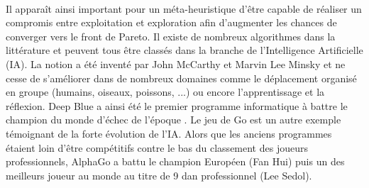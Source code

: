 



\paragraph{} %
Il apparaît ainsi important pour un méta-heuristique d’être capable de réaliser
un compromis entre exploitation et exploration afin d’augmenter les chances de
converger vers le front de Pareto. Il existe de nombreux algorithmes dans la littérature
et peuvent tous être classés dans la branche de l’Intelligence Artificielle (IA).
La notion a été inventé par John McCarthy et Marvin Lee Minsky et ne cesse de s’améliorer
dans de nombreux domaines comme le déplacement organisé en groupe (humains, oiseaux, poissons, ...)
ou encore l’apprentissage et la réflexion. Deep Blue a ainsi été le premier programme
informatique à battre le champion du monde d’échec de l’époque \parencite{Hsu199970}.
Le jeu de Go est un autre exemple témoignant de la forte évolution de l’IA. Alors que
les anciens programmes étaient loin d’être compétitifs contre le bas du classement
des joueurs professionnels, AlphaGo \parencite{Silver2016484} a battu le champion Européen (Fan Hui)
puis un des meilleurs joueur au monde au titre de 9 dan professionnel (Lee Sedol).


